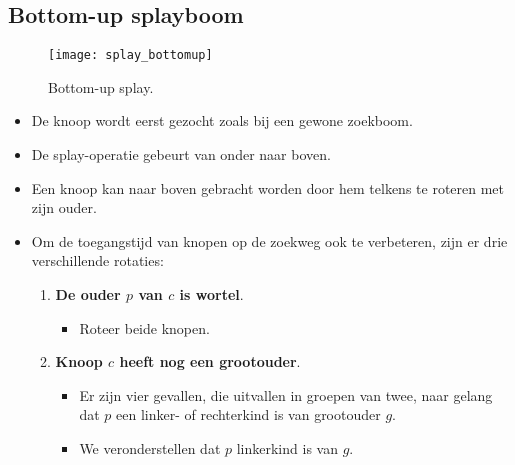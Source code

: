 \subsection{Bottom-up splayboom}
\begin{figure}[ht]
    \centering
    \texttt{[image: splay\_bottomup]}
    \caption{Bottom-up splay.}
    \label{fig:splay_bottomup}
\end{figure}
\begin{itemize}
    \item De knoop wordt eerst gezocht zoals bij een gewone zoekboom.
    \item De splay-operatie gebeurt van onder naar boven.
    \item Een knoop kan naar boven gebracht worden door hem telkens te roteren met zijn ouder.
    \item Om de toegangstijd van knopen op de zoekweg ook te verbeteren, zijn er drie verschillende rotaties:
    \begin{enumerate}
        \item \textbf{De ouder $p$ van $c$ is wortel}. 
        \begin{itemize}
            \item Roteer beide knopen.
        \end{itemize}
        \item \textbf{Knoop $c$ heeft nog een grootouder}.
        \begin{itemize}
            \item Er zijn vier gevallen, die uitvallen in groepen van twee, naar gelang dat $p$ een linker- of rechterkind is van grootouder $g$.
            \item We veronderstellen dat $p$ linkerkind is van $g$.
        \end{itemize}
        

\end{enumerate}
\end{itemize}
